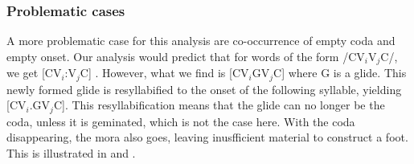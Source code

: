 
\subsubsection{Problematic cases}\label{sec:phon:Problematiccases}


A more problematic case for this analysis are co-occurrence of empty coda and empty onset. Our analysis would predict that for words of the form /CV$_i$V$_j$C/, we get [CV$_i$:V$_j$C] . However, what we find is [CV$_i$GV$_j$C] where G is a glide. This newly formed glide is  resyllabified to the onset of the following syllable, yielding [CV$_i$.GV$_j$C]. This resyllabification means that the glide can no longer be the coda, unless it is geminated, which is not the case here. With the coda disappearing, the mora also goes, leaving inusfficient material to construct a foot. This is illustrated in  and .


